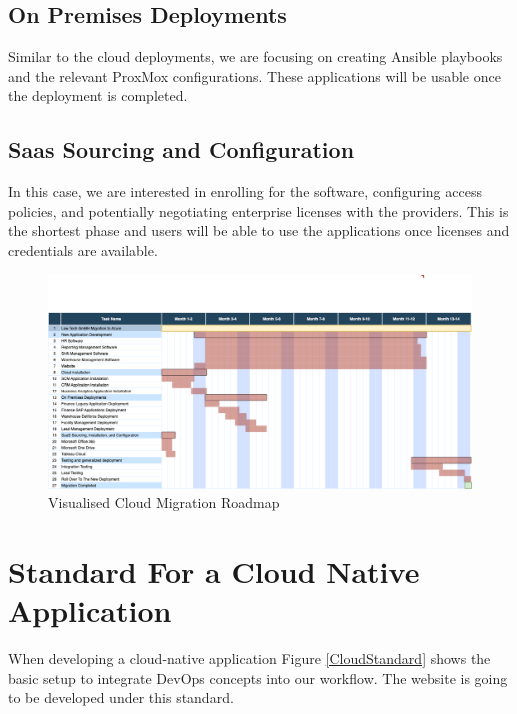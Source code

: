 \documentclass{llncs}
\begin{document}
\subsection{On Premises Deployments}

Similar to the cloud deployments, we are focusing on creating Ansible playbooks and the relevant ProxMox configurations. These applications will be usable once the deployment is completed.

\subsection{Saas Sourcing and Configuration}

In this case, we are interested in enrolling for the software, configuring access policies, and potentially negotiating enterprise licenses with the providers. This is the shortest phase and users will be able to use the applications once licenses and credentials are available.

\begin{figure}[htbp]
    \begin{center}
        \includegraphics[width=1\textwidth]{diagrams/roadmap.png}
        \vspace{0.01\textwidth}
        \caption{Visualised Cloud Migration Roadmap}
        \label{cloud migration roadmap} %
    \end{center}
\end{figure}


\section{Standard For a Cloud Native Application}

When developing a cloud-native application Figure \ref{CloudStandard} shows the basic setup to integrate DevOps concepts into our workflow.
The website is going to be developed under this standard.\\
\end{document}
